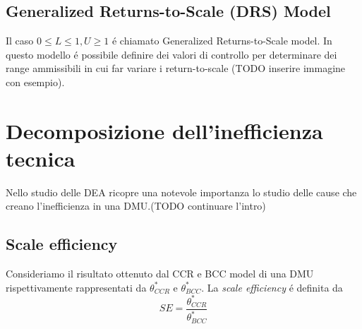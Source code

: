 \subsection{Generalized Returns-to-Scale (DRS) Model}
\bigskip
Il caso $0 \leq L \leq 1, U \geq 1$ \'e chiamato Generalized Returns-to-Scale model. In questo modello \'e possibile definire dei valori di controllo per determinare dei range ammissibili in cui far variare i return-to-scale (TODO inserire immagine con esempio).
\section{Decomposizione dell'inefficienza tecnica}
\bigskip

Nello studio delle DEA ricopre una notevole importanza lo studio delle cause che creano l'inefficienza in una DMU.(TODO continuare l'intro)

\subsection{Scale efficiency}

\begin{definiz} \label{EQ:scale efficiency}
Consideriamo il risultato ottenuto dal CCR e BCC model di una DMU rispettivamente rappresentati da $\theta^*_{CCR}$ e $\theta^*_{BCC}$. La \emph{scale efficiency} \'e definita da
\begin{equation}
SE = \frac{\theta^*_{CCR}}{\theta^*_{BCC}}
\end{equation}
\end{definiz}

